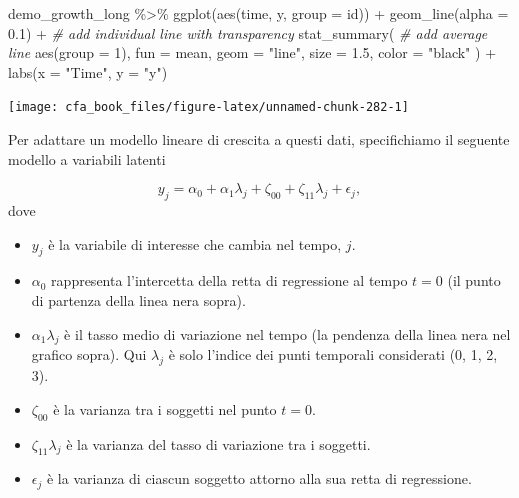 \documentclass[
  11pt,
]{krantz}
\makeatletter
\newenvironment{Shaded}{\begin{snugshade}}{\end{snugshade}}
\newcommand{\AttributeTok}[1]{\textcolor[rgb]{0.61,0.61,0.61}{#1}}
\newcommand{\CommentTok}[1]{\textcolor[rgb]{0.37,0.37,0.37}{\textit{#1}}}
\newcommand{\DecValTok}[1]{\textcolor[rgb]{0.06,0.06,0.06}{#1}}
\newcommand{\FloatTok}[1]{\textcolor[rgb]{0.06,0.06,0.06}{#1}}
\newcommand{\FunctionTok}[1]{\textcolor[rgb]{0,0,0}{#1}}
\newcommand{\NormalTok}[1]{#1}
\newcommand{\SpecialCharTok}[1]{\textcolor[rgb]{0,0,0}{#1}}
\newcommand{\StringTok}[1]{\textcolor[rgb]{0.5,0.5,0.5}{#1}}
\providecommand{\tightlist}{%
  \setlength{\itemsep}{0pt}\setlength{\parskip}{0pt}}
\newenvironment{kframe}{%
\medskip{}
\setlength{\fboxsep}{.8em}
 \def\at@end@of@kframe{}%
 \ifinner\ifhmode%
  \def\at@end@of@kframe{\end{minipage}}%
  \begin{minipage}{\columnwidth}%
 \fi\fi%
 \def\FrameCommand##1{\hskip\@totalleftmargin \hskip-\fboxsep
 \colorbox{shadecolor}{##1}\hskip-\fboxsep
     \hskip-\linewidth \hskip-\@totalleftmargin \hskip\columnwidth}%
 \MakeFramed {\advance\hsize-\width
   \@totalleftmargin\z@ \linewidth\hsize
   \@setminipage}}%
 {\par\unskip\endMakeFramed%
 \at@end@of@kframe}
\renewenvironment{Shaded}{\begin{kframe}}{\end{kframe}}
\theoremstyle{definition}
\theoremstyle{definition}
\theoremstyle{definition}
\theoremstyle{definition}
\theoremstyle{remark}
\makeatother
\begin{document}
\begin{Shaded}
\begin{Highlighting}[]
\NormalTok{demo\_growth\_long }\SpecialCharTok{\%\textgreater{}\%}
  \FunctionTok{ggplot}\NormalTok{(}\FunctionTok{aes}\NormalTok{(time, y, }\AttributeTok{group =}\NormalTok{ id)) }\SpecialCharTok{+}
  \FunctionTok{geom\_line}\NormalTok{(}\AttributeTok{alpha =} \FloatTok{0.1}\NormalTok{) }\SpecialCharTok{+} \CommentTok{\# add individual line with transparency}
  \FunctionTok{stat\_summary}\NormalTok{( }\CommentTok{\# add average line}
    \FunctionTok{aes}\NormalTok{(}\AttributeTok{group =} \DecValTok{1}\NormalTok{),}
    \AttributeTok{fun =}\NormalTok{ mean,}
    \AttributeTok{geom =} \StringTok{"line"}\NormalTok{,}
    \AttributeTok{size =} \FloatTok{1.5}\NormalTok{,}
    \AttributeTok{color =} \StringTok{"black"}
\NormalTok{  ) }\SpecialCharTok{+}
  \FunctionTok{labs}\NormalTok{(}\AttributeTok{x =} \StringTok{"Time"}\NormalTok{, }\AttributeTok{y =} \StringTok{"y"}\NormalTok{)}
\end{Highlighting}
\end{Shaded}

\begin{center}\texttt{[image: cfa\_book\_files/figure-latex/unnamed-chunk-282-1]} \end{center}

Per adattare un modello lineare di crescita a questi dati, specifichiamo il seguente modello a variabili latenti

\[
y_j = \alpha_0 + \alpha_1 \lambda_j + \zeta_{00} + \zeta_{11} \lambda_j + \epsilon_j,
\] dove

\begin{itemize}
\tightlist
\item
  \(y_j\) è la variabile di interesse che cambia nel tempo, \(j\).
\item
  \(\alpha_0\) rappresenta l'intercetta della retta di regressione al tempo \(t = 0\) (il punto di partenza della linea nera sopra).
\item
  \(\alpha_1 \lambda_j\) è il tasso medio di variazione nel tempo (la pendenza della linea nera nel grafico sopra). Qui \(\lambda_j\) è solo l'indice dei punti temporali considerati (0, 1, 2, 3).
\item
  \(\zeta_{00}\) è la varianza tra i soggetti nel punto \(t = 0\).
\item
  \(\zeta_{11} \lambda_j\) è la varianza del tasso di variazione tra i soggetti.
\item
  \(\epsilon_j\) è la varianza di ciascun soggetto attorno alla sua retta di regressione.
\end{itemize}
\end{document}
